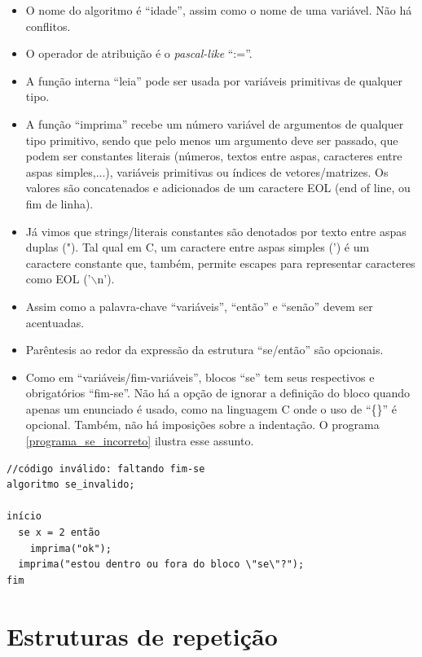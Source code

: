 \documentclass[a4paper,11pt]{report}
\begin{document}
\begin{itemize}
  \item O nome do algoritmo é ``idade'', assim como o nome de uma variável. Não
    há conflitos.
  \item O operador de atribuição é o \textit{pascal-like} ``:=''.
  \item A função interna ``leia'' pode ser usada por variáveis primitivas de
    qualquer tipo.
  \item A função ``imprima'' recebe um número variável de argumentos de qualquer
    tipo primitivo, sendo que pelo menos um argumento deve ser passado, que
    podem ser constantes literais (números, textos entre aspas, caracteres entre
    aspas simples,...), variáveis primitivas ou índices de vetores/matrizes. Os
    valores são concatenados e adicionados de um caractere EOL (end of line, ou
    fim de linha).
  \item Já vimos que strings/literais constantes são denotados por texto entre
    aspas duplas ("). Tal qual em C, um caractere entre aspas simples (') é um
    caractere constante que, também, permite escapes para representar caracteres
    como EOL ('$\backslash$n').
  \item Assim como a palavra-chave ``variáveis'', ``então'' e ``senão'' devem
    ser acentuadas.
  \item Parêntesis ao redor da expressão da estrutura ``se/então'' são
    opcionais.
  \item Como em ``variáveis/fim-variáveis'', blocos ``se'' tem seus respectivos
    e obrigatórios ``fim-se''. Não há a opção de ignorar a definição do bloco
    quando apenas um enunciado é usado, como na linguagem C onde o uso de
    ``\{\}'' é opcional. Também, não há imposições sobre a indentação. O
    programa \ref{programa_se_incorreto}
    ilustra esse assunto.
\end{itemize}

\begin{program}
  \begin{verbatim}
//código inválido: faltando fim-se
algoritmo se_invalido;

início
  se x = 2 então
    imprima("ok");
  imprima("estou dentro ou fora do bloco \"se\"?");
fim
  \end{verbatim}
  \caption{Uso incorreto de estrutura condicional.
\label{programa_se_incorreto}}
\end{program}

\section{Estruturas de repetição}
\end{document}
